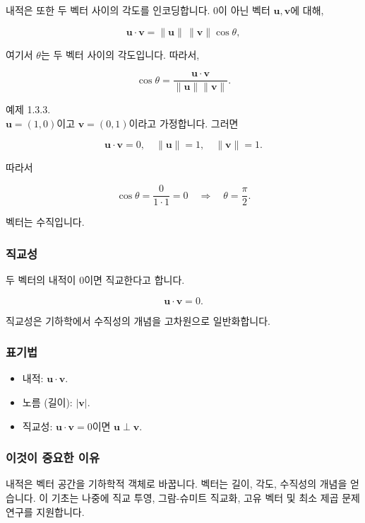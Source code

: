\documentclass[
  12pt,
  a4paper,
]{article}
\begin{document}
내적은 또한 두 벡터 사이의 각도를 인코딩합니다. 0이 아닌 벡터 \(\mathbf{u}, \mathbf{v}\)에 대해,

\[\mathbf{u} \cdot \mathbf{v} = \|\mathbf{u}\| \, \|\mathbf{v}\| \cos \theta,\]

여기서 \(\theta\)는 두 벡터 사이의 각도입니다. 따라서,

\[\cos \theta = \frac{\mathbf{u} \cdot \mathbf{v}}{\|\mathbf{u}\|\|\mathbf{v}\|}.\]

예제 1.3.3.\\
\(\mathbf{u} = (1,0)\)이고 \(\mathbf{v} = (0,1)\)이라고 가정합니다. 그러면

\[\mathbf{u} \cdot \mathbf{v} = 0, \quad \|\mathbf{u}\| = 1, \quad \|\mathbf{v}\| = 1.\]

따라서

\[\cos \theta = \frac{0}{1\cdot 1} = 0 \quad \Rightarrow \quad \theta = \frac{\pi}{2}.\]

벡터는 수직입니다.

\subsubsection{직교성}\label{orthogonality}

두 벡터의 내적이 0이면 직교한다고 합니다.

\[\mathbf{u} \cdot \mathbf{v} = 0.\]

직교성은 기하학에서 수직성의 개념을 고차원으로 일반화합니다.

\subsubsection{표기법}\label{notation-3}

\begin{itemize}
\item
  내적: \(\mathbf{u} \cdot \mathbf{v}\).
\item
  노름 (길이): \(|\mathbf{v}|\).
\item
  직교성: \(\mathbf{u} \cdot \mathbf{v} = 0\)이면 \(\mathbf{u} \perp \mathbf{v}\).
\end{itemize}

\subsubsection{이것이 중요한 이유}\label{why-this-matters-2}

내적은 벡터 공간을 기하학적 객체로 바꿉니다. 벡터는 길이, 각도, 수직성의 개념을 얻습니다. 이 기초는 나중에 직교 투영, 그람-슈미트
직교화, 고유 벡터 및 최소 제곱 문제 연구를 지원합니다.
\end{document}
